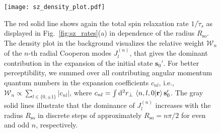 \documentclass[superscriptaddress,noshowpacs,noshowkeys, twocolumn, floatfix,aps, prb,reprint]{revtex4-1}
\begin{document}
%
\begin{figure}[t]
\texttt{[image: sz\_density\_plot.pdf]}
\caption{The red solid line shows again the total spin relaxation rate $1/\tilde{\tau}_s$ as displayed in Fig.~\ref{fig:sz_rates}(a) in dependence of the radius $R_\text{so}$.
The density plot in the background visualizes the relative weight $\mathcal{W}_n$ of the $n$-th radial Cooperon modes $J_l^{(n)}$, that gives the dominant contribution in the expansion of the initial state $\mathbf{s}_0'$.
For better perceptibility, we summed over all contributing angular momentum quantum numbers in the expansion coefficients $c_{nl}$, i.e., $\mathcal{W}_n\propto\sum_{l\in\{0,\pm 1\}}\vert c_{nl}\vert $, where $c_{nl}=\int {\rm d}^2r_\perp\, \braket{n,l,0|\mathbf{r}}\mathbf{s}_0'$. 
The gray solid lines illustrate that the dominance of $J_l^{(n)}$ increases with the radius $R_\text{so}$ in discrete steps of approximately $R_\text{so}=n \pi/2$ for even and odd $n$, respectively.}
\label{fig:sz_density_plot}
\end{figure}%
\end{document}
